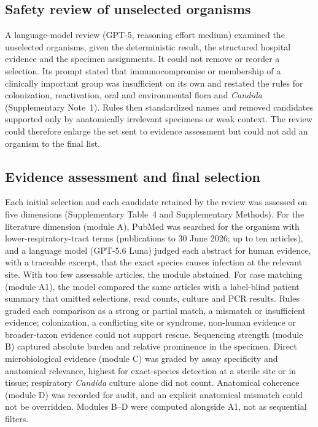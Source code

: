 \subsection*{Safety review of unselected organisms}
A language-model review (GPT-5, reasoning effort medium) examined the unselected organisms, given the deterministic result, the structured hospital evidence and the specimen assignments. It could not remove or reorder a selection. Its prompt stated that immunocompromise or membership of a clinically important group was insufficient on its own and restated the rules for colonization, reactivation, oral and environmental flora and \textit{Candida} (Supplementary Note~1). Rules then standardized names and removed candidates supported only by anatomically irrelevant specimens or weak context. The review could therefore enlarge the set sent to evidence assessment but could not add an organism to the final list.

\subsection*{Evidence assessment and final selection}
Each initial selection and each candidate retained by the review was assessed on five dimensions (Supplementary Table~4 and Supplementary Methods). For the literature dimension (module A), PubMed was searched for the organism with lower-respiratory-tract terms (publications to 30 June 2026; up to ten articles), and a language model (GPT-5.6 Luna) judged each abstract for human evidence, with a traceable excerpt, that the exact species causes infection at the relevant site. With too few assessable articles, the module abstained. For case matching (module A1), the model compared the same articles with a label-blind patient summary that omitted selections, read counts, culture and PCR results. Rules graded each comparison as a strong or partial match, a mismatch or insufficient evidence; colonization, a conflicting site or syndrome, non-human evidence or broader-taxon evidence could not support rescue. Sequencing strength (module B) captured absolute burden and relative prominence in the specimen. Direct microbiological evidence (module C) was graded by assay specificity and anatomical relevance, highest for exact-species detection at a sterile site or in tissue; respiratory \textit{Candida} culture alone did not count. Anatomical coherence (module D) was recorded for audit, and an explicit anatomical mismatch could not be overridden. Modules B--D were computed alongside A1, not as sequential filters.

